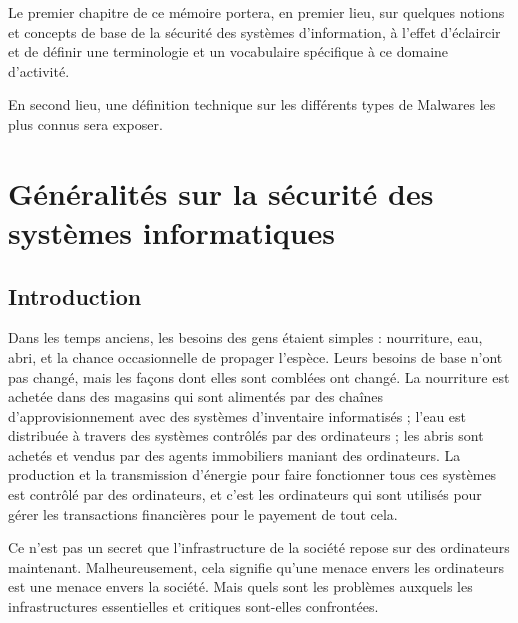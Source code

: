 
Le premier chapitre de ce mémoire portera, en premier lieu, sur quelques notions et concepts de base de la 
sécurité des systèmes d’information, à l’effet d’éclaircir et de définir une terminologie et un vocabulaire 
spécifique à ce domaine d’activité. 

En second lieu, une définition technique sur les différents types de Malwares les plus connus sera exposer. %

\newpage

\section{Généralités sur la sécurité des systèmes informatiques}
    \subsection{Introduction}
    Dans les temps anciens, les besoins des gens étaient simples : nourriture, eau, abri, et la chance occasionnelle
    de propager l'espèce. Leurs besoins de base n'ont pas changé, mais les façons dont elles sont comblées ont changé.
    La nourriture est achetée dans des magasins qui sont alimentés par des chaînes d'approvisionnement avec des
    systèmes d'inventaire informatisés ; l'eau est distribuée à travers des systèmes contrôlés par des ordinateurs ; 
    les abris sont achetés et vendus par des agents immobiliers maniant des ordinateurs.
    La production et la transmission d'énergie pour faire fonctionner tous ces systèmes est contrôlé par des
    ordinateurs, et c'est les ordinateurs qui sont utilisés pour gérer les transactions financières pour le 
    payement de tout cela. \cite{virus} %

    Ce n'est pas un secret que l'infrastructure de la société repose sur des ordinateurs maintenant.
    Malheureusement, cela signifie qu'une menace envers les ordinateurs est une menace envers la société. 
    Mais quels sont les problèmes auxquels les infrastructures essentielles et critiques sont-elles confrontées.%

